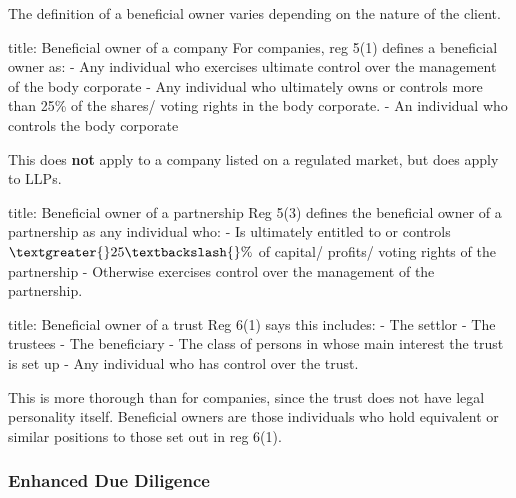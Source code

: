 \documentclass[
]{article}
\newenvironment{Shaded}{}{}
\newcommand{\NormalTok}[1]{#1}
\begin{document}
The definition of a beneficial owner varies depending on the nature of
the client.

\begin{Shaded}
\begin{Highlighting}[]
\NormalTok{title: Beneficial owner of a company}
\NormalTok{For companies, reg 5(1) defines a beneficial owner as:}
\NormalTok{{-} Any individual who exercises ultimate control over the management of the body corporate}
\NormalTok{{-} Any individual who ultimately owns or controls more than 25\% of the shares/ voting rights in the body corporate. }
\NormalTok{{-} An individual who controls the body corporate}
\end{Highlighting}
\end{Shaded}

This does \textbf{not} apply to a company listed on a regulated market,
but does apply to LLPs.

\begin{Shaded}
\begin{Highlighting}[]
\NormalTok{title: Beneficial owner of a partnership}
\NormalTok{Reg 5(3) defines the beneficial owner of a partnership as any individual who:}
\NormalTok{{-} Is ultimately entitled to or controls $\textgreater{}25\textbackslash{}\%$ of capital/ profits/ voting rights of the partnership}
\NormalTok{{-} Otherwise exercises control over the management of the partnership.}
\end{Highlighting}
\end{Shaded}

\begin{Shaded}
\begin{Highlighting}[]
\NormalTok{title: Beneficial owner of a trust}
\NormalTok{Reg 6(1) says this includes:}
\NormalTok{{-} The settlor}
\NormalTok{{-} The trustees}
\NormalTok{{-} The beneficiary}
\NormalTok{{-} The class of persons in whose main interest the trust is set up}
\NormalTok{{-} Any individual who has control over the trust. }
\end{Highlighting}
\end{Shaded}

This is more thorough than for companies, since the trust does not have
legal personality itself. Beneficial owners are those individuals who
hold equivalent or similar positions to those set out in reg 6(1).

\hypertarget{enhanced-due-diligence}{%
\subsubsection{Enhanced Due Diligence}\label{enhanced-due-diligence}}
\end{document}
